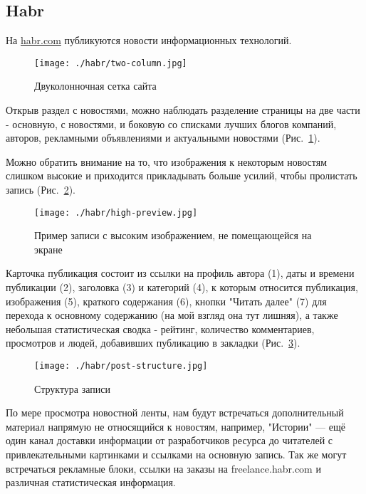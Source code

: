 \subsection{Habr}

На \href{https://rbc.ru/}{habr.com} публикуются новости информационных технологий.

\begin{figure}[!ht]
  \centering
    \texttt{[image: ./habr/two-column.jpg]}
    \caption{Двуколонночная сетка сайта}
  \label{two-column}
\end{figure}

Открыв раздел с новостями, можно наблюдать разделение страницы на две части - основную, с новостями, и боковую со списками лучших блогов компаний, авторов, рекламными объявлениями и актуальными новостями (Рис.~\ref{two-column}).

Можно обратить внимание на то, что изображения к некоторым новостям слишком высокие и приходится прикладывать больше усилий, чтобы пролистать запись (Рис.~\ref{high-preview}).

\begin{figure}[!ht]
    \centering
      \texttt{[image: ./habr/high-preview.jpg]}
      \caption{Пример записи с высоким изображением, не помещающейся на экране}
    \label{high-preview}
  \end{figure}

  Карточка публикация состоит из ссылки на профиль автора (1), даты и времени публикации (2), заголовка (3) и категорий (4), к которым относится публикация, изображения (5), краткого содержания (6), кнопки "Читать далее" (7) для перехода к основному содержанию (на мой взгляд она тут лишняя), а также небольшая статистическая сводка - рейтинг, количество комментариев, просмотров и людей, добавивших публикацию в закладки (Рис.~\ref{post-structure}). 

  \begin{figure}[!ht]
    \centering
      \texttt{[image: ./habr/post-structure.jpg]}
      \caption{Структура записи}
    \label{post-structure}
  \end{figure}

  По мере просмотра новостной ленты, нам будут встречаться дополнительный материал напрямую не относящийся к новостям, например, "Истории" --- ещё один канал доставки информации от разработчиков ресурса до читателей с привлекательными картинками и ссылками на основную запись. Так же могут встречаться рекламные блоки, ссылки на заказы на freelance.habr.com и различная статистическая информация.

